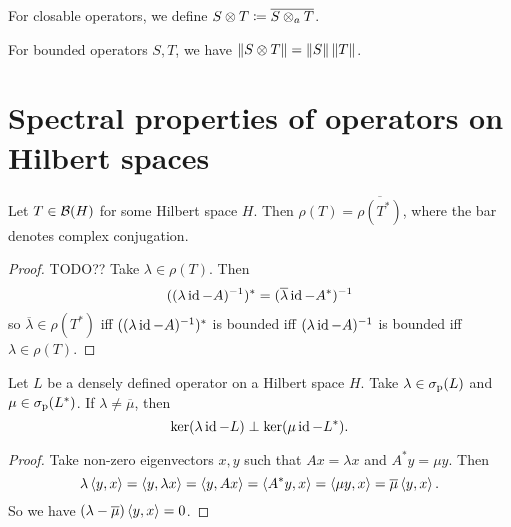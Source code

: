 For closable operators, we define $S\otimes T \coloneqq \overline{S\otimes_a T}$.

\begin{proposition}
For bounded operators $S,T$, we have $\lVert S\otimes T\rVert = \lVert S\rVert\,\lVert T\rVert$.
\end{proposition}

\section{Spectral properties of operators on Hilbert spaces}
\begin{lemma}
Let $T \in \operatorname{\mathcal{B}}(H)$ for some Hilbert space $H$. Then
$\rho(T) = \overline{\rho(T^*)}$, where the bar denotes complex conjugation.
\end{lemma}
\begin{proof}
TODO?? Take $\lambda\in\rho(T)$. Then
\[ ((\lambda\operatorname{id} - A)^{-1})^* = (\overline{\lambda}\operatorname{id} - A^*)^{-1} \]
so $\overline{\lambda}\in\rho(T^*)$ iff $((\lambda\operatorname{id} - A)^{-1})^*$ is bounded iff $(\lambda\operatorname{id} - A)^{-1}$ is bounded iff $\lambda\in \rho(T)$.
\end{proof}

\begin{lemma} \label{eigenspaceOrthogonalAdjoint}
Let $L$ be a densely defined operator on a Hilbert space $H$. Take $\lambda\in \sigma_\text{p}(L)$ and $\mu\in\sigma_\text{p}(L^*)$. If $\lambda \neq \overline{\mu}$, then
\[ \ker(\lambda\operatorname{id} - L)\perp \ker(\mu\operatorname{id} - L^*). \]
\end{lemma}
\begin{proof}
Take non-zero eigenvectors $x,y$ such that $Ax = \lambda x$ and $A^*y = \mu y$. Then
\[ \lambda \left\langle y,x \right\rangle = \left\langle y,\lambda x \right\rangle = \left\langle y, Ax \right\rangle = \left\langle A^*y,x \right\rangle = \left\langle \mu y,x \right\rangle = \overline{\mu}\left\langle y,x \right\rangle. \]
So we have $(\lambda - \overline{\mu})\left\langle y,x \right\rangle = 0$.
\end{proof}

